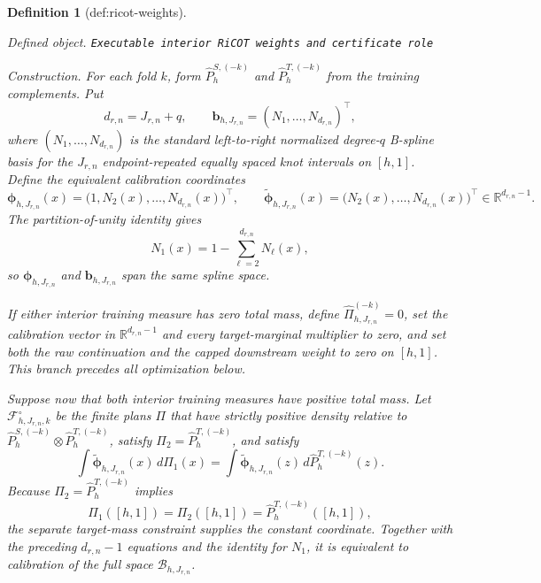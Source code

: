 \documentclass{article}
\newtheorem{definition}{Definition}
\begin{document}
\begin{definition}[def:ricot-weights]\label{def:ricot-weights}
\par\smallskip\noindent\emph{Defined object.} \texttt{Executable interior RiCOT weights and certificate role}
\par\smallskip\noindent\emph{Construction.} For each fold \(k\), form \(\widehat P^{S,(-k)}_h\) and \(\widehat P^{T,(-k)}_h\) from the training complements. Put
\[
d_{r,n}=J_{r,n}+q,
\qquad
\mathbf b_{h,J_{r,n}}=(N_1,\ldots,N_{d_{r,n}})^\top,
\]
where \((N_1,\ldots,N_{d_{r,n}})\) is the standard left-to-right normalized degree-\(q\) B-spline basis for the \(J_{r,n}\) endpoint-repeated equally spaced knot intervals on \([h,1]\). Define the equivalent calibration coordinates
\[
\boldsymbol\phi_{h,J_{r,n}}(x)=\bigl(1,N_2(x),\ldots,N_{d_{r,n}}(x)\bigr)^\top,
\qquad
\widetilde{\boldsymbol\phi}_{h,J_{r,n}}(x)=\bigl(N_2(x),\ldots,N_{d_{r,n}}(x)\bigr)^\top
\in\mathbb R^{d_{r,n}-1}.
\]
The partition-of-unity identity gives
\[
N_1(x)=1-\sum_{\ell=2}^{d_{r,n}}N_\ell(x),
\]
so \(\boldsymbol\phi_{h,J_{r,n}}\) and \(\mathbf b_{h,J_{r,n}}\) span the same spline space.

If either interior training measure has zero total mass, define \(\widehat\Pi^{(-k)}_{h,J_{r,n}}=0\), set the calibration vector in \(\mathbb R^{d_{r,n}-1}\) and every target-marginal multiplier to zero, and set both the raw continuation and the capped downstream weight to zero on \([h,1]\). This branch precedes all optimization below.

Suppose now that both interior training measures have positive total mass. Let \(\mathcal F^\circ_{h,J_{r,n},k}\) be the finite plans \(\Pi\) that have strictly positive density relative to \(\widehat P^{S,(-k)}_h\otimes\widehat P^{T,(-k)}_h\), satisfy \(\Pi_2=\widehat P^{T,(-k)}_h\), and satisfy
\[
\int\widetilde{\boldsymbol\phi}_{h,J_{r,n}}(x)\,d\Pi_1(x)
=\int\widetilde{\boldsymbol\phi}_{h,J_{r,n}}(z)\,d\widehat P^{T,(-k)}_h(z).
\]
Because \(\Pi_2=\widehat P^{T,(-k)}_h\) implies
\[
\Pi_1([h,1])=\Pi_2([h,1])=\widehat P^{T,(-k)}_h([h,1]),
\]
the separate target-mass constraint supplies the constant coordinate. Together with the preceding \(d_{r,n}-1\) equations and the identity for \(N_1\), it is equivalent to calibration of the full space \(\mathcal B_{h,J_{r,n}}\).


\end{definition}
\end{document}
